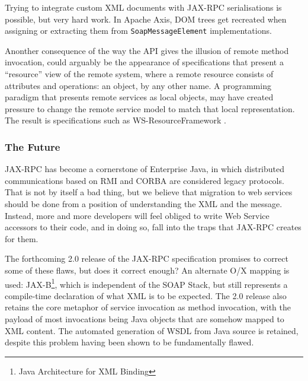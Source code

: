  Trying to integrate custom
XML documents with JAX-RPC serialisations is possible, but very hard
work. In Apache Axis, DOM trees get recreated when assigning or
extracting them from {\tt SoapMessageElement} implementations.

Anonther consequence of the way the API gives the illusion of remote method
invocation, could arguably be the appearance of specifications that present a
``resource'' view of the remote system, where a remote resource consists of 
attributes and operations: an object, by any other name. 
A programming paradigm that presents remote services as local objects, may have
created pressure to change the remote service model to match that local
representation. The result is specifications such as WS-ResourceFramework
\cite{spec:ws-rf}.
 


\subsubsection{The Future}
\label{objections:implications:future}

JAX-RPC has become a cornerstone of Enterprise Java, in
which distributed communications based on RMI and CORBA are considered
legacy protocols. That is not by itself a bad thing, but we believe
that migration to web services should be done from a position of
understanding the XML and the message. Instead, more and more
developers will feel obliged to write Web Service accessors to their
code, and in doing so, fall into the traps that JAX-RPC creates for
them.

The forthcoming 2.0 release of the JAX-RPC specification promises to
correct some of these flaws, but does it correct enough? An alternate
O/X mapping is used: JAX-B\footnote{Java Architecture for XML
Binding}, which is independent of the SOAP Stack, but still represents
a compile-time declaration of what XML is to be expected. The 2.0
release also retains the core metaphor of service invocation as method
invocation, with the payload of most invocations being Java objects
that are somehow mapped to XML content. The automated generation of
WSDL from Java source is retained, despite this problem having been
shown to be fundamentally flawed.

